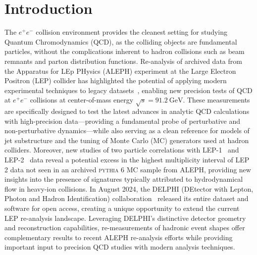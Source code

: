 \documentclass[a4paper,11pt]{article}
\begin{document}
\section{Introduction}
\label{sec:Introduction}
The $e^{+}e^{-}$ collision environment provides the cleanest setting for studying Quantum Chromodynamics (QCD), as the colliding objects are fundamental particles, without the complications inherent to hadron collisions such as beam remnants and parton distribution functions.
Re-analysis of archived data from the Apparatus for LEp PHysics (ALEPH) experiment at the Large Electron Positron (LEP) collider has highlighted the potential of applying modern experimental techniques to legacy datasets~\cite{Chen:2021uws, Bossi:2025xsi, Badea:2025wzd, Badea:2019vey, Chen:2023njr}, enabling new precision tests of QCD at $e^+e^-$ collisions at center-of-mass energy $\sqrt{s}=91.2~\mathrm{GeV}$.
These measurements are specifically designed to test the latest advances in analytic QCD calculations with high-precision data—providing a fundamental probe of perturbative and non-perturbative dynamics—while also serving as a clean reference for models of jet substructure and the tuning of Monte Carlo (MC) generators used at hadron colliders.
Moreover, new studies of two particle correlations with LEP-1~\cite{Badea:2019vey} and LEP-2~\cite{Chen:2023njr} data reveal a potential excess in the highest multiplicity interval of LEP 2 data not seen in an archived \textsc{pythia} 6 MC sample from ALEPH, providing new insights into the presence of signatures typically attributed to hydrodynamical flow in heavy-ion collisions. 
In August 2024, the DELPHI (DEtector with Lepton, Photon and Hadron Identification) collaboration~\cite{DELPHI:1990cdc} released its entire dataset and software for open access, creating a unique opportunity to extend the current LEP re-analysis landscape.
Leveraging DELPHI's distinctive detector geometry and reconstruction capabilities, re-measurements of hadronic event shapes offer complementary results to recent ALEPH re-analysis efforts while providing important input to precision QCD studies with modern analysis techniques.
\end{document}
